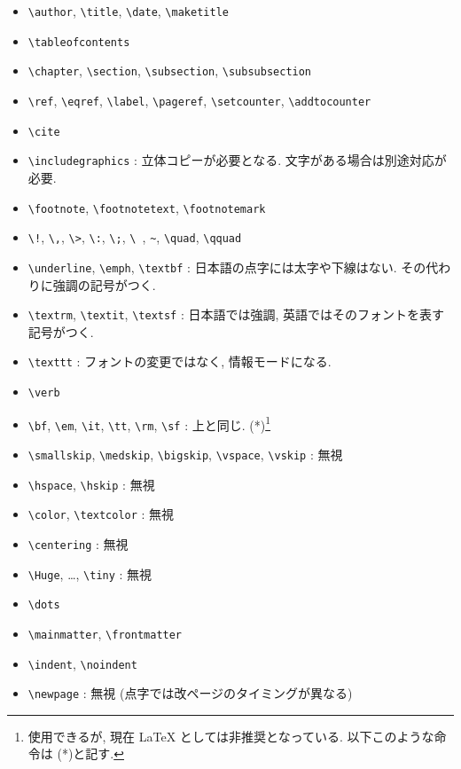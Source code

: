 \documentclass[lualatex,ja=standard,jafont=haranoaji]{bxjsarticle}
\def\dep{(*)}
\begin{document}
\begin{itemize}
\item \verb|\author|, \verb|\title|, \verb|\date|, \verb|\maketitle|
\item \verb|\tableofcontents|
\item \verb|\chapter|, \verb|\section|, \verb|\subsection|, \verb|\subsubsection|
\item \verb|\ref|, \verb|\eqref|, \verb|\label|,
  \verb|\pageref|, \verb|\setcounter|, \verb|\addtocounter|
\item \verb|\cite|
\item \verb|\includegraphics| : 立体コピーが必要となる. 文字がある場合は別途対応が必要.
\item \verb|\footnote|, \verb|\footnotetext|, \verb|\footnotemark|
\item \verb|\!|, \verb|\,|, \verb|\>|, \verb|\:|, \verb|\;|, \verb|\ |, \verb|~|, \verb|\quad|, \verb|\qquad|
\item \verb|\underline|, \verb|\emph|,   \verb|\textbf| : 日本語の点字には太字や下線はない. その代わりに強調の記号がつく.
\item   \verb|\textrm|,
  \verb|\textit|,
  \verb|\textsf| : 日本語では強調, 英語ではそのフォントを表す記号がつく.
\item   \verb|\texttt| : フォントの変更ではなく, 情報モードになる.
\item \verb|\verb|
\item \verb|\bf|,
  \verb|\em|, \verb|\it|, \verb|\tt|, \verb|\rm|, \verb|\sf| : 上と同じ. \dep\footnote{使用できるが, 現在 LaTeX としては非推奨となっている. 以下このような命令は \dep と記す.}
\item \verb|\smallskip|,
  \verb|\medskip|, \verb|\bigskip|,
  \verb|\vspace|, \verb|\vskip| : 無視
\item \verb|\hspace|, \verb|\hskip| : 無視
\item \verb|\color|, \verb|\textcolor| : 無視
\item \verb|\centering| : 無視
\item \verb|\Huge|, \dots, \verb|\tiny| : 無視
\item \verb|\dots|
\item \verb|\mainmatter|, \verb|\frontmatter|
\item \verb|\indent|, \verb|\noindent|
\item \verb|\newpage| : 無視 (点字では改ページのタイミングが異なる)
  

\end{itemize}
\end{document}
